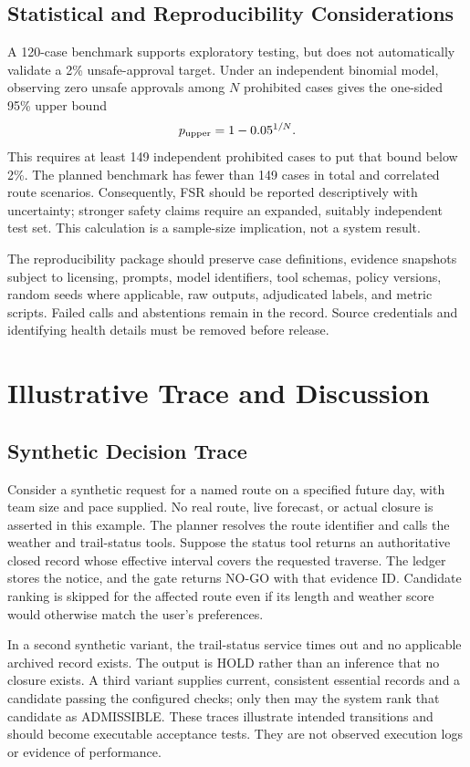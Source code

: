 \documentclass[conference]{IEEEtran}
\begin{document}
\subsection{Statistical and Reproducibility Considerations}
A 120-case benchmark supports exploratory testing, but does not automatically validate a 2\% unsafe-approval target. Under an independent binomial model, observing zero unsafe approvals among $N$ prohibited cases gives the one-sided 95\% upper bound
\begin{equation}
 p_{\rm upper}=1-0.05^{1/N}.
\end{equation}
This requires at least 149 independent prohibited cases to put that bound below 2\%. The planned benchmark has fewer than 149 cases in total and correlated route scenarios. Consequently, FSR should be reported descriptively with uncertainty; stronger safety claims require an expanded, suitably independent test set. This calculation is a sample-size implication, not a system result.

The reproducibility package should preserve case definitions, evidence snapshots subject to licensing, prompts, model identifiers, tool schemas, policy versions, random seeds where applicable, raw outputs, adjudicated labels, and metric scripts. Failed calls and abstentions remain in the record. Source credentials and identifying health details must be removed before release.

\section{Illustrative Trace and Discussion}
\subsection{Synthetic Decision Trace}
Consider a synthetic request for a named route on a specified future day, with team size and pace supplied. No real route, live forecast, or actual closure is asserted in this example. The planner resolves the route identifier and calls the weather and trail-status tools. Suppose the status tool returns an authoritative closed record whose effective interval covers the requested traverse. The ledger stores the notice, and the gate returns NO-GO with that evidence ID. Candidate ranking is skipped for the affected route even if its length and weather score would otherwise match the user's preferences.

In a second synthetic variant, the trail-status service times out and no applicable archived record exists. The output is HOLD rather than an inference that no closure exists. A third variant supplies current, consistent essential records and a candidate passing the configured checks; only then may the system rank that candidate as ADMISSIBLE. These traces illustrate intended transitions and should become executable acceptance tests. They are not observed execution logs or evidence of performance.
\end{document}
